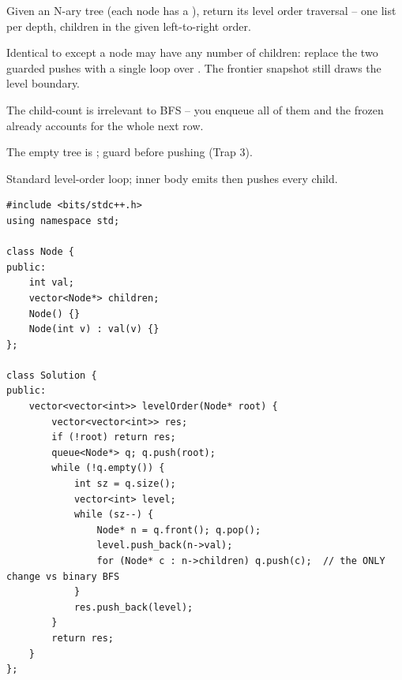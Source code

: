 \begin{problemstatement}
Given an N-ary tree (each node has a ), return its level
order traversal -- one list per depth, children in the given left-to-right order.
\end{problemstatement}

Identical to  except a node may have any number of children: replace the
two guarded pushes with a single loop over . The frontier snapshot still
draws the level boundary.

\begin{observation}
The child-count is irrelevant to BFS -- you enqueue all of them and the frozen 
already accounts for the whole next row.
\end{observation}
\begin{observation}
The empty tree is ; guard before pushing (Trap 3).
\end{observation}

Standard level-order loop; inner body emits  then pushes every child.

\begin{lstlisting}[caption={N-ary Level Order (LeetCode 429)}, label={lst:c03-nary-level}]
#include <bits/stdc++.h>
using namespace std;

class Node {
public:
    int val;
    vector<Node*> children;
    Node() {}
    Node(int v) : val(v) {}
};

class Solution {
public:
    vector<vector<int>> levelOrder(Node* root) {
        vector<vector<int>> res;
        if (!root) return res;
        queue<Node*> q; q.push(root);
        while (!q.empty()) {
            int sz = q.size();
            vector<int> level;
            while (sz--) {
                Node* n = q.front(); q.pop();
                level.push_back(n->val);
                for (Node* c : n->children) q.push(c);  // the ONLY change vs binary BFS
            }
            res.push_back(level);
        }
        return res;
    }
};
\end{lstlisting}


